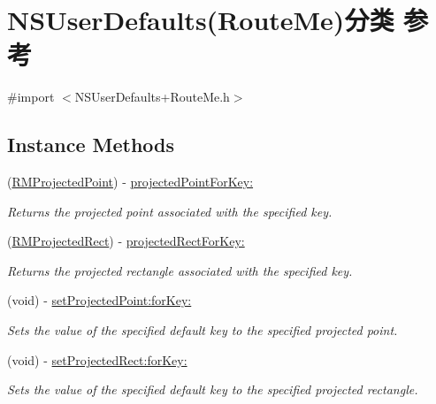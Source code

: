 \hypertarget{category_n_s_user_defaults_07_route_me_08}{\section{N\-S\-User\-Defaults(Route\-Me)分类 参考}
\label{category_n_s_user_defaults_07_route_me_08}
}


{\ttfamily \#import $<$N\-S\-User\-Defaults+\-Route\-Me.\-h$>$}

\subsection*{Instance Methods}
\begin{DoxyCompactItemize}
\item 
(\hyperlink{struct_r_m_projected_point}{R\-M\-Projected\-Point}) -\/ \hyperlink{category_n_s_user_defaults_07_route_me_08_ad8a25763f783a99a2bfadb0da95f8a81}{projected\-Point\-For\-Key\-:}
\begin{DoxyCompactList}\small\item\em Returns the projected point associated with the specified key. \end{DoxyCompactList}\item 
(\hyperlink{struct_r_m_projected_rect}{R\-M\-Projected\-Rect}) -\/ \hyperlink{category_n_s_user_defaults_07_route_me_08_a5030a509dec55919a3c3fe1c1d50742d}{projected\-Rect\-For\-Key\-:}
\begin{DoxyCompactList}\small\item\em Returns the projected rectangle associated with the specified key. \end{DoxyCompactList}\item 
(void) -\/ \hyperlink{category_n_s_user_defaults_07_route_me_08_a52132ca0b7fcca712426d0f206bb9dbf}{set\-Projected\-Point\-:for\-Key\-:}
\begin{DoxyCompactList}\small\item\em Sets the value of the specified default key to the specified projected point. \end{DoxyCompactList}\item 
(void) -\/ \hyperlink{category_n_s_user_defaults_07_route_me_08_a6f6112e9dc8f46e0c9b2bbc004243c8d}{set\-Projected\-Rect\-:for\-Key\-:}
\begin{DoxyCompactList}\small\item\em Sets the value of the specified default key to the specified projected rectangle. \end{DoxyCompactList}\end{DoxyCompactItemize}


